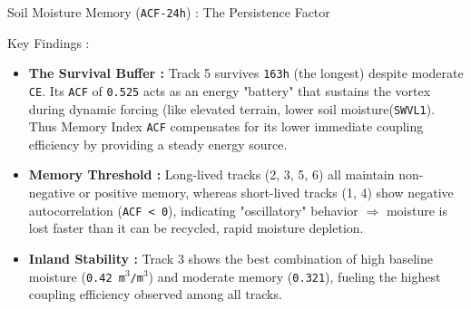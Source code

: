 \documentclass[8pt, aspectratio=169]{beamer}
\begin{document}
\begin{frame}{Soil Moisture Memory (\texttt{ACF-24h}) : The Persistence Factor}
    \footnotesize
    \begin{block}{Key Findings :}
        \begin{itemize}
            \item \textbf{The Survival Buffer :} Track 5 survives \texttt{163h} (the longest) despite moderate \texttt{CE}. Its \texttt{ACF} of \texttt{0.525} acts as an energy "battery" that sustains the vortex during dynamic forcing (like elevated terrain, lower soil moisture(\texttt{SWVL1}). Thus Memory Index \texttt{ACF} compensates for its lower immediate coupling efficiency by providing a steady energy source.
            \item \textbf{Memory Threshold :} Long-lived tracks (2, 3, 5, 6) all maintain non-negative or positive memory, whereas short-lived tracks (1, 4) show negative autocorrelation (\texttt{ACF < 0}), indicating "oscillatory" behavior $\Rightarrow$ moisture is lost faster than it can be recycled,  rapid moisture depletion.
            \item \textbf{Inland Stability :} Track 3 shows the best combination of high baseline moisture (\texttt{0.42 m$^3$/m$^3$}) and moderate memory (\texttt{0.321}), fueling the highest coupling efficiency observed among all tracks.
        \end{itemize}
    \end{block}
\end{frame}
\end{document}
